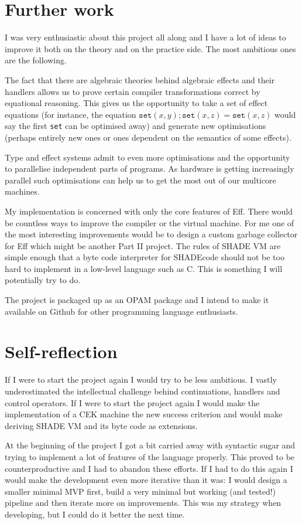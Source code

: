 \documentclass[class=article, crop=false]{standalone}
\begin{document}
\section{Further work}

I was very enthusiastic about this project all along and I have a lot of ideas to improve it both on the theory and on the
practice side. The most ambitious ones are the following.

The fact that there are algebraic theories behind algebraic effects and their handlers allows us to prove certain
compiler transformations correct by equational reasoning. This gives us the opportunity to take a set of effect
equations (for instance, the equation $\mathtt{set}(x,y); \mathtt{set}(x,z) = \mathtt{set}(x, z)$ would say the first
\texttt{set} can be optimised away) and generate new optimisations (perhaps entirely new ones or ones dependent on the
semantics of some effects).

Type and effect systems admit to even more optimisations and the opportunity to parallelise independent parts of programs.
As hardware is getting increasingly parallel such optimisations can help us to get the most out of our multicore machines.

My implementation is concerned with only the core features of Eff. There would be countless ways to improve the compiler
or the virtual machine. For me one of the most interesting improvements would be to design a custom garbage collector for Eff
which might be another Part II project. The rules of SHADE VM are simple enough that a byte code interpreter for SHADEcode
should not be too hard to implement in a low-level language such as C. This is something I will potentially try to do.

The project is packaged up as an OPAM package and I intend to make it available on Github for other programming
language enthusiasts.


\section{Self-reflection}

If I were to start the project again I would try to be less ambitious. I vastly underestimated the intellectual challenge
behind continuations, handlers and control operators. If I were to start the project again I would make the implementation
of a CEK machine the new success criterion and would make deriving SHADE VM and its byte code as extensions.

At the beginning of the project I got a bit carried away with syntactic sugar and trying to implement a lot of features
of the language properly. This proved to be counterproductive and I had to abandon these efforts. If I had to do this
again I would make the development even more iterative than it was: I would design a smaller minimal MVP first, build
a very minimal but working (and tested!) pipeline and then iterate more on improvements. This was my strategy when developing,
but I could do it better the next time.
\end{document}
